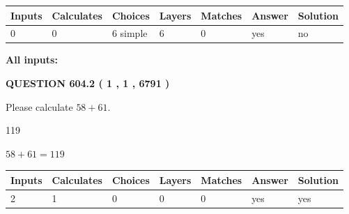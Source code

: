 \documentclass[12pt]{article}
\begin{document}
 
\noindent{}
 
 
   
   
   
   
\noindent\begin{tabular}{|l|l|l|l|l|l|l|}
 \hline
Inputs & Calculates & Choices & Layers & Matches & Answer & Solution \\ \hline
 0  & 
 0  & 
 6
  simple  
  & 
 6  & 
 0  & 
  yes & 
  no 
  \\ \hline
 \end{tabular}
   
   
   
   
\noindent{}
   
   
   
   
\noindent\vspace{0.1in}\hspace{-0.08in} {\textbf{\Large{All inputs: }}}
   
   
  
\vspace{0.2in}
  
{\textbf{\Large{QUESTION
604.2 
 ( 1 , 1 , 6791 )
}}}
  
  
 
Please calculate $ %
58 +  %
61 $.
 
 
 
\noindent{}
 
 

119
 
 
\noindent{}
 
 

 
 
 
\noindent{}
 
 

$ %
58 +  %
61=   %
119$
 
 
\noindent{}
 
 

 
   
   
   
   
\noindent\begin{tabular}{|l|l|l|l|l|l|l|}
 \hline
Inputs & Calculates & Choices & Layers & Matches & Answer & Solution \\ \hline
 2  & 
 1  & 
 0
  & 
 0  & 
 0  & 
  yes & 
  yes 
  \\ \hline
 \end{tabular}
   
\end{document}
